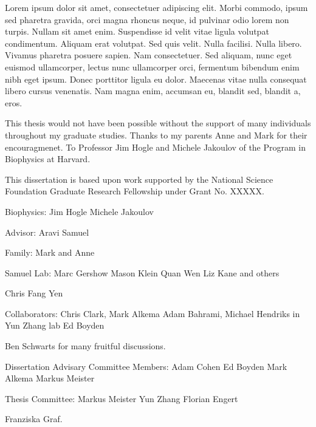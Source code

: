 
Lorem ipsum dolor sit amet, consectetuer adipiscing elit. Morbi commodo, ipsum sed pharetra gravida, orci magna rhoncus neque, id pulvinar odio lorem non turpis. Nullam sit amet enim. Suspendisse id velit vitae ligula volutpat condimentum. Aliquam erat volutpat. Sed quis velit. Nulla facilisi. Nulla libero. Vivamus pharetra posuere sapien. Nam consectetuer. Sed aliquam, nunc eget euismod ullamcorper, lectus nunc ullamcorper orci, fermentum bibendum enim nibh eget ipsum. Donec porttitor ligula eu dolor. Maecenas vitae nulla consequat libero cursus venenatis. Nam magna enim, accumsan eu, blandit sed, blandit a, eros.

This thesis would not have been possible without the support of many individuals throughout my graduate studies. Thanks to my parents Anne and Mark for their encouragmenet. To Professor Jim Hogle and Michele Jakoulov of the Program in Biophysics at Harvard. 

This dissertation is based upon work supported by the National Science Foundation Graduate Research Fellowship under Grant No. XXXXX.

Biophysics:
  Jim Hogle
  Michele Jakoulov

Advisor:
  Aravi Samuel

Family:
  Mark and Anne

Samuel Lab:
  Marc Gershow
  Mason Klein
  Quan Wen
  Liz Kane and others

Chris Fang Yen

Collaborators:
   Chris Clark, Mark Alkema
   Adam Bahrami, Michael Hendriks in Yun Zhang lab
   Ed Boyden
   
Ben Schwarts for many fruitful discussions.

Dissertation Advisary Committee Members:
   Adam Cohen
   Ed Boyden
   Mark Alkema
   Markus Meister
   
Thesis Committee:
	Markus Meister
	Yun Zhang
	Florian Engert

Franziska Graf.